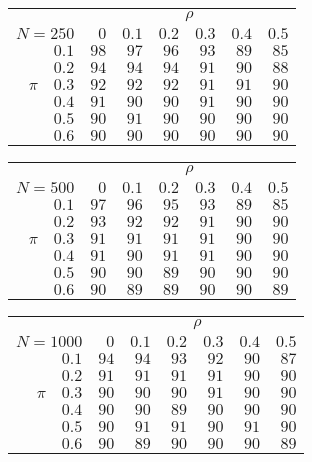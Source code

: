 \begin{tabular}{r|rrrrrr}
\hline\hline
 &\multicolumn{6}{c}{$\rho$} \\ 
 $N = 250$ & $0$ & $0.1$ & $0.2$ & $0.3$ & $0.4$ & $0.5$ \\ 
 \hline$0.1$ & $98$ & $97$ & $96$ & $93$ & $89$ & $85$\\ 
$0.2$ & $94$ & $94$ & $94$ & $91$ & $90$ & $88$\\ 
$\pi\quad$$0.3$ & $92$ & $92$ & $92$ & $91$ & $91$ & $90$\\ 
$0.4$ & $91$ & $90$ & $90$ & $91$ & $90$ & $90$\\ 
$0.5$ & $90$ & $91$ & $90$ & $90$ & $90$ & $90$\\ 
$0.6$ & $90$ & $90$ & $90$ & $90$ & $90$ & $90$\\ 
 \hline 
 \end{tabular}
 
 \vspace{2em} 
 
\begin{tabular}{r|rrrrrr}
\hline\hline
 &\multicolumn{6}{c}{$\rho$} \\ 
 $N = 500$ & $0$ & $0.1$ & $0.2$ & $0.3$ & $0.4$ & $0.5$ \\ 
 \hline$0.1$ & $97$ & $96$ & $95$ & $93$ & $89$ & $85$\\ 
$0.2$ & $93$ & $92$ & $92$ & $91$ & $90$ & $90$\\ 
$\pi\quad$$0.3$ & $91$ & $91$ & $91$ & $91$ & $90$ & $90$\\ 
$0.4$ & $91$ & $90$ & $91$ & $91$ & $90$ & $90$\\ 
$0.5$ & $90$ & $90$ & $89$ & $90$ & $90$ & $90$\\ 
$0.6$ & $90$ & $89$ & $89$ & $90$ & $90$ & $89$\\ 
 \hline 
 \end{tabular}
 
 \vspace{2em} 
 
\begin{tabular}{r|rrrrrr}
\hline\hline
 &\multicolumn{6}{c}{$\rho$} \\ 
 $N = 1000$ & $0$ & $0.1$ & $0.2$ & $0.3$ & $0.4$ & $0.5$ \\ 
 \hline$0.1$ & $94$ & $94$ & $93$ & $92$ & $90$ & $87$\\ 
$0.2$ & $91$ & $91$ & $91$ & $91$ & $90$ & $90$\\ 
$\pi\quad$$0.3$ & $90$ & $90$ & $90$ & $91$ & $90$ & $90$\\ 
$0.4$ & $90$ & $90$ & $89$ & $90$ & $90$ & $90$\\ 
$0.5$ & $90$ & $91$ & $91$ & $90$ & $91$ & $90$\\ 
$0.6$ & $90$ & $89$ & $90$ & $90$ & $90$ & $89$\\ 
 \hline 
 \end{tabular}